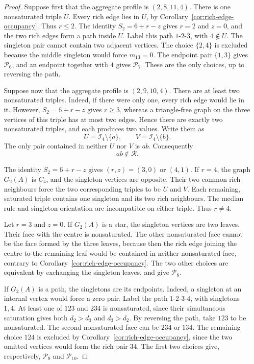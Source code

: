 \documentclass[11pt,a4paper]{article}
\theoremstyle{definition}
\newcommand{\Ind}{\mathcal I}
\begin{document}
\begin{proof}
Suppose first that the aggregate profile is $(2,8,11,4)$. There is one
nonsaturated triple $U$. Every rich edge lies in $U$, by
Corollary~\ref{cor:rich-edge-occupancy}. Thus $r\leq2$. The identity
$S_2=6+r-z$ gives
$r=2$ and $z=0$, and the two rich edges form a path inside $U$. Label
this path $1$-$2$-$3$, with $4\notin U$. The singleton pair cannot
contain two adjacent vertices. The choice $\{2,4\}$ is excluded because
the middle singleton would force $m_{13}=0$. The endpoint pair
$\{1,3\}$ gives $\mathcal P_6$, and an endpoint together with $4$
gives $\mathcal P_7$. These are the only choices, up to reversing the
path.

Suppose now that the aggregate profile is $(2,9,10,4)$. There are at
least two nonsaturated triples. Indeed, if there were only one, every
rich edge would lie in it. However, $S_2=6+r-z$ gives $r\geq3$,
whereas a triangle-free graph on the three vertices of this triple has
at most two edges. Hence
there are exactly two nonsaturated triples, and each produces two values.
Write them as
$$
U=\Ind_4\setminus\{a\},
\qquad
V=\Ind_4\setminus\{b\}.
$$
The only pair contained in neither $U$ nor $V$ is $ab$. Consequently
$$
ab\notin\mathcal R.
$$

The identity $S_2=6+r-z$ gives $(r,z)=(3,0)$ or $(4,1)$. If $r=4$, the graph $G_2(A)$ is
$C_4$, and the singleton vertices are opposite. Their two common rich
neighbours force the two corresponding triples to be $U$ and $V$. Each
remaining, saturated triple contains one singleton and its two rich
neighbours. The median rule and singleton orientation are incompatible
on either triple. Thus $r\neq4$.

Let $r=3$ and $z=0$. If $G_2(A)$ is a star, the singleton vertices
are two leaves. Their face with the centre is nonsaturated. The other
nonsaturated face cannot be the face formed by the three leaves, because
then the rich edge joining the centre to the remaining leaf would be
contained in neither nonsaturated face, contrary to
Corollary~\ref{cor:rich-edge-occupancy}. The two other choices are equivalent
by exchanging the singleton leaves, and give $\mathcal P_8$.

If $G_2(A)$ is a path, the singletons are its endpoints. Indeed, a
singleton at an internal vertex would force a zero pair. Label the path
$1$-$2$-$3$-$4$, with singletons $1,4$. At least one of $123$ and
$234$ is nonsaturated, since their simultaneous saturation gives both
$d_2>d_3$ and $d_3>d_2$. By reversing the path, take $123$ to be
nonsaturated. The second nonsaturated face can be $234$ or $134$.
The remaining choice $124$ is excluded by
Corollary~\ref{cor:rich-edge-occupancy}, since the two omitted vertices would
form the rich pair $34$. The first two choices give, respectively,
$\mathcal P_9$ and $\mathcal P_{10}$.
\end{proof}
\end{document}
